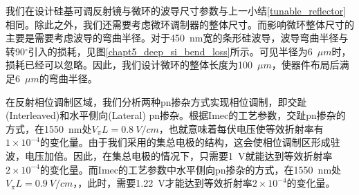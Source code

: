 我们在设计硅基可调反射镜与微环的波导尺寸参数与上一小结\ref{tunable_reflector}相同。除此之外，我们还需要考虑微环调制器的整体尺寸。而影响微环整体尺寸的主要是需要考虑波导的弯曲半径。对于450~nm宽的条形硅波导，波导弯曲半径与转90$^\circ$引入的损耗，见图\ref{chapt5_deep_si_bend_loss}所示。可见半径为6~$\mu m$时，损耗已经可以忽略。因此，我们设计微环的整体长度为100~$\mu m$，使器件布局后满足6~$\mu m$的弯曲半径。

在反射相位调制区域，我们分析两种pn掺杂方式实现相位调制，即交趾(Interleaved)和水平侧向(Lateral) pn掺杂。根据Imec的工艺参数\cite{Imec}，交趾pn掺杂的方式\cite{li2009silicon,pantouvaki2013comparison}，在1550~nm处$V_\pi L = 0.8~V/cm$，也就意味着每伏电压使等效折射率有$1 \times  10^{-4}$的变化量。由于我们采用的集总电极的结构，这会使相位调制区形成驻波，电压加倍。因此，在集总电极的情况下，只需要1~V就能达到等效折射率$2 \times  10^{-4}$的变化量。而Imec的工艺参数中水平侧向pn掺杂的方式\cite{pantouvaki2013comparison}，在1550~nm处$V_\pi L = 0.9~V/cm$，，此时，需要1.22~V才能达到等效折射率$2 \times 10^{-4}$的变化量。

